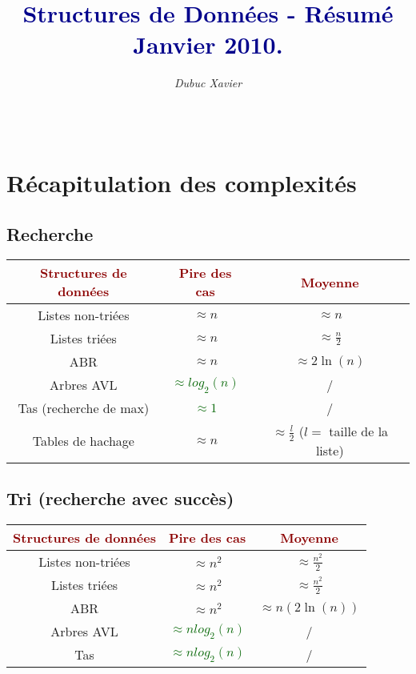 \documentclass{article}
\title{\textbf{\textcolor{darkblue}{Structures de Données - Résumé Janvier 2010.}}}
\author{\textit{Dubuc Xavier}}
\newcommand{\dred}[1]{\textcolor{darkred}{\textbf{#1}}}
\newcommand{\gre}[1]{\textcolor{darkgreen}{#1}}
\begin{document}
\maketitle

\hbox{\raisebox{0.4em}{\vrule depth 0.4pt height 0.4pt width 10cm}}

\tableofcontents

$ $ \\
\hbox{\raisebox{0.4em}{\vrule depth 0.4pt height 0.4pt width 10cm}}

\newpage

\section{Récapitulation des complexités}

\subsection{Recherche}

\begin{tabular}{|*{3}{c|}}
	\hline
	\dred{Structures de données} & \dred{Pire des cas} & \dred{Moyenne} \\
	\hline
	Listes non-triées  & $\approx n$ & $\approx n$ \\
	\hline
	Listes triées  & $\approx n$ & $\approx \frac{n}{2}$\\
	\hline
	ABR & $\approx n$ & $\approx 2\ln{(n)}$ \\
	\hline
	Arbres AVL & \gre{$\approx log_2{(n)}$} & /\\
	\hline
	Tas (recherche de max) & \gre{$\approx 1$} & /\\
	\hline
	Tables de hachage & $\approx n$ & $\approx \frac{l}{2}$ ($l =$ taille de la liste)\\
	\hline
\end{tabular}

\subsection{Tri (recherche avec succès)}

\begin{tabular}{|*{3}{c|}}
	\hline
	\dred{Structures de données} & \dred{Pire des cas} & \dred{Moyenne} \\
	\hline
	Listes non-triées  & $\approx n^2$ & $\approx \frac{n^2}{2}$ \\
	\hline
	Listes triées  & $\approx n^2$ & $\approx \frac{n^2}{2}$\\
	\hline
	ABR & $\approx n^2$ & $\approx n(2\ln{(n)})$\\
	\hline
	Arbres AVL & \gre{$\approx nlog_2{(n)}$} & /\\
	\hline
	Tas & \gre{$\approx nlog_2{(n)}$} & /\\
	\hline
\end{tabular}
\end{document}
